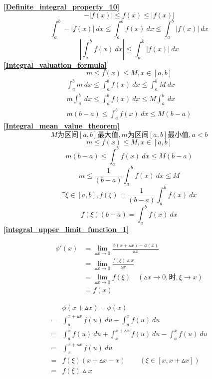 \textbf{\large \ref{Definite_integral_property_10}}
	$$-\left|f(x)\right|\leqslant f(x)\leqslant\left|f(x)\right|$$
	$$\int_{a}^{b} -\left|f(x)\right|\ dx\leqslant \int_{a}^{b}f(x)\ dx\leqslant \int_{a}^{b} \left|f(x)\right| \ dx$$
	$$\left|\int_{a}^{b}f(x)\ dx\right|\leqslant \int_{a}^{b} \left|f(x)\right| \ dx$$
\textbf{\large \ref{Integral_valuation_formula}}
$$m\leqslant f(x)\leqslant M,x\in\left[a,b\right]$$
\begin{align*}
	\int_{a}^{b}m\ dx \leqslant \int_{a}^{b}f(x)\ dx\leqslant \int_{a}^{b}M\ dx\\
	m\int_{a}^{b}\ dx \leqslant \int_{a}^{b}f(x)\ dx\leqslant M\int_{a}^{b}\ dx\\
	m(b-a)\leqslant \int_{a}^{b}f(x)\ dx\leqslant M(b-a)
\end{align*}
\textbf{\large \ref{Integral_mean_value_theorem}}
	$$M\mbox{为区间$\left[a,b\right]$最大值},m\mbox{为区间$\left[a,b\right]$最小值},a<b$$
	$$m\leqslant f(x)\leqslant M,x\in\left[a,b\right]$$
	$$m(b-a)\leqslant \int_{a}^{b}f(x)\ dx\leqslant M(b-a)$$
	$$m\leqslant \frac{1}{(b-a)}\int_{a}^{b}f(x)\ dx\leqslant M$$
	$$\exists \xi\in\left[a,b\right], f(\xi)=\frac{1}{(b-a)}\int_{a}^{b}f(x)\ dx$$
	$$f(\xi)(b-a)=\int_{a}^{b}f(x)\ dx$$
\textbf{\large \ref{integral_upper_limit_function_1}}\\
\begin{minipage}{.5\textwidth}
	\begin{align*}
		\phi'(x)&=\lim\limits_{\vartriangle x\to 0}\frac{\phi(x+\vartriangle x)-\phi(x)}{\vartriangle x}\\
		&=\lim\limits_{\vartriangle x\to 0}\frac{f(\xi)\vartriangle x}{\vartriangle x}\\
		&=\lim\limits_{\vartriangle x\to 0}f(\xi)\quad(\vartriangle x\rightarrow 0,\mbox{时},\xi \rightarrow x)\\
		&=f(x)
	\end{align*}
\end{minipage}
\hfill
\vline
\begin{minipage}{.5\textwidth}
	\begin{align*}
		&\phi(x+\vartriangle x)-\phi(x)\\
		=&\int_{a}^{x+\vartriangle x}f(u)\ du-\int_{a}^{x}f(u)\ du\\
		=&\int_{a}^{x}f(u)\ du+\int_{x}^{x+\vartriangle x}f(u)\ du-\int_{a}^{x}f(u)\ du\\
		=&\int_{x}^{x+\vartriangle x}f(u)\ du\\
		=&f(\xi)(x+\vartriangle x-x)\qquad(\xi\in\left[x,x+\vartriangle x\right])\\
		=&f(\xi)\vartriangle x
	\end{align*}
\end{minipage}
